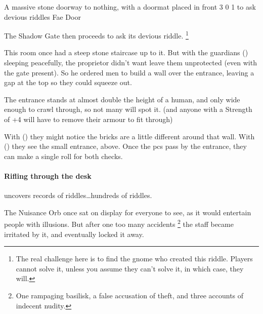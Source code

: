 \begin{multicols}{2}
  {A massive stone doorway to nothing, with a doormat placed in front}%
  {3}%
  {0}%
  {1}%
  {to ask devious riddles}%
  {Fae Door}%
  {
    \setcounter{Fire}{2}
    \setcounter{Earth}{3}
    \setcounter{Water}{1}
    \setcounter{Academics}{2}
    \setcounter{Caving}{1}
    \setcounter{Xenomology}{1}
  }%

\showStdSpells[
  \setcounter{diceNo}{0}
]

The Shadow Gate then proceeds to ask its devious riddle.%
\footnote{The real challenge here is to find the gnome who created this riddle. Players cannot solve it, unless you assume they can't solve it, in which case, they will.}

\hardestRiddleEver


\begin{exampletext}
  This room once had a steep stone staircase up to it.
  But with the guardians () sleeping peacefully, the proprietor didn't want leave them unprotected (even with the gate present).
  So he ordered men to build a wall over the entrance, leaving a gap at the top so they could squeeze out.
\end{exampletext}

The entrance stands at almost double the height of a human, and only wide enough to crawl through, so not many will spot it.
(and anyone with a Strength of +4 will have to remove their armour to fit through)

With  (\tn[14]) they might notice the bricks are a little different around that wall.
With  (\tn[12]) they see the small entrance, above.
Once the \glspl{pc} pass by the entrance, they can make a single roll for both checks.

\paragraph{Rifling through the desk}
uncovers records of riddles\ldots hundreds of riddles.


\begin{exampletext}
  The Nuisance Orb once sat on display for everyone to see, as it would entertain people with illusions.
  But after one too many accidents%
  \footnote{One rampaging basilisk, a false accusation of theft, and three accounts of indecent nudity.}
  the staff became irritated by it, and eventually locked it away.
\end{exampletext}


\end{multicols}
